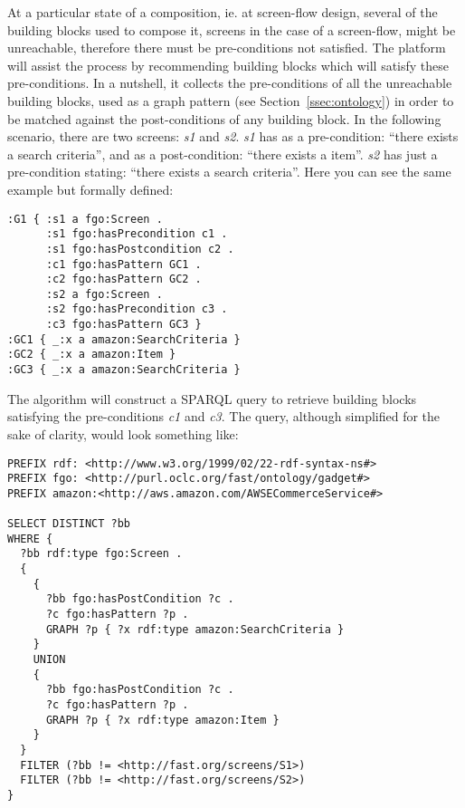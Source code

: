 At a particular state of a composition, ie. at screen-flow design, several of the building blocks used to compose it, 
screens in the case of a screen-flow, might be unreachable, therefore there must be pre-conditions not satisfied. The
platform will assist the process by recommending building blocks which will satisfy these pre-conditions. In a nutshell,
it collects the pre-conditions of all the unreachable building blocks, used as a graph pattern (see Section~\ref{ssec:ontology})
in order to be matched against the post-conditions of any building block. In the following scenario, there are two 
screens: \emph{s1} and \emph{s2}. \emph{s1} has as a pre-condition: ``there exists a search criteria'', and as a 
post-condition: ``there exists a item''. \emph{s2} has just a pre-condition stating: ``there exists a search criteria''.
Here you can see the same example but formally defined:

\begin{listing}
\begin{verbatim}
:G1 { :s1 a fgo:Screen .      
      :s1 fgo:hasPrecondition c1 .
      :s1 fgo:hasPostcondition c2 .
      :c1 fgo:hasPattern GC1 .
      :c2 fgo:hasPattern GC2 .
      :s2 a fgo:Screen .      
      :s2 fgo:hasPrecondition c3 .
      :c3 fgo:hasPattern GC3 }
:GC1 { _:x a amazon:SearchCriteria }
:GC2 { _:x a amazon:Item }
:GC3 { _:x a amazon:SearchCriteria }
\end{verbatim}
\label{lis:discovery_example}
\end{listing}

The algorithm will construct a SPARQL query to retrieve building blocks satisfying the pre-conditions \emph{c1} and \emph{c3}. 
The query, although simplified for the sake of clarity, would look something like:

\begin{listing}
\begin{verbatim}
PREFIX rdf: <http://www.w3.org/1999/02/22-rdf-syntax-ns#>
PREFIX fgo: <http://purl.oclc.org/fast/ontology/gadget#>
PREFIX amazon:<http://aws.amazon.com/AWSECommerceService#>

SELECT DISTINCT ?bb 
WHERE { 
  ?bb rdf:type fgo:Screen . 
  {
    {
      ?bb fgo:hasPostCondition ?c .
      ?c fgo:hasPattern ?p .
      GRAPH ?p { ?x rdf:type amazon:SearchCriteria } 
    }
    UNION
    {
      ?bb fgo:hasPostCondition ?c .
      ?c fgo:hasPattern ?p .
      GRAPH ?p { ?x rdf:type amazon:Item } 
    }
  }
  FILTER (?bb != <http://fast.org/screens/S1>) 
  FILTER (?bb != <http://fast.org/screens/S2>) 
}
\end{verbatim}
\label{lis:sparql_find}
\end{listing}

